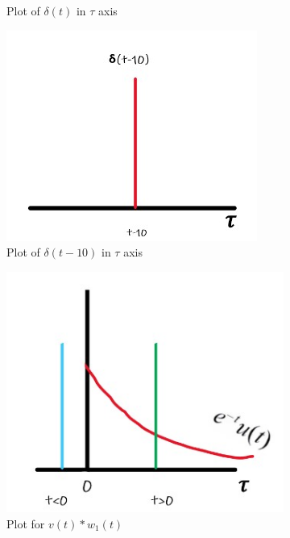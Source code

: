 \documentclass{article}[12 pt]
\begin{document}
\begin{figure}[H]
\begin{subfigure}{.5\textwidth}
  \caption{Plot of $\delta(t)$ in $\tau$ axis}
  \label{fig:sub-second}
\end{subfigure}
\newline
\begin{subfigure}{\textwidth}
  \centering
  \includegraphics{3.jpg}  
  \caption{Plot of $\delta(t-10)$ in $\tau$ axis}
  \label{fig:sub-third}
\end{subfigure}
\newline
\begin{subfigure}{.5\textwidth}
  \centering
  \includegraphics[width=.8\linewidth, height=.8\linewidth]{4.jpg}  
  \caption{Plot for $v(t)*w_1(t)$}
  \label{fig:sub-fourth}
\end{subfigure}
\begin{subfigure}{.5\textwidth}
  \centering

\end{subfigure}
\end{figure}
\end{document}
